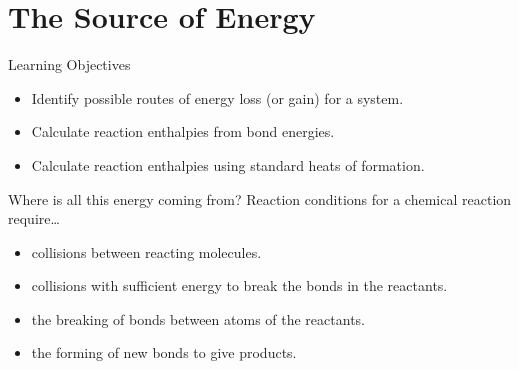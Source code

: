 \documentclass[notes=only]{beamer}
\begin{document}
\section{The Source of Energy}

\begin{frame}{Learning Objectives}
	\begin{itemize}
	\item Identify possible routes of energy loss (or gain) for a system.
	\item Calculate reaction enthalpies from bond energies.
	\item Calculate reaction enthalpies using standard heats of formation.
	\end{itemize}
\end{frame}

\begin{frame}{Where is all this energy coming from?}
	\alert{Reaction conditions} for a chemical reaction require\ldots
	\begin{itemize}
		\item collisions between reacting molecules.
		\item collisions with sufficient energy to break the bonds in
			the reactants.
		\item the breaking of bonds between atoms of the reactants.
		\item the forming of new bonds to give products.
	\end{itemize}
\end{frame}
\end{document}
